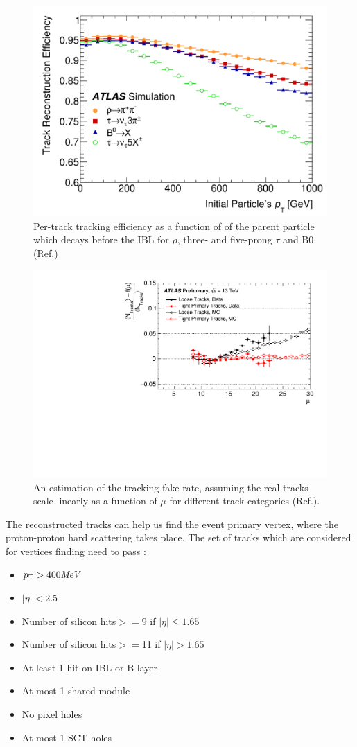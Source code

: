 \begin{figure}[htpb!]
\begin{center}
  \includegraphics[width=0.55\linewidth]{figures/Reco/TrackingEfficiency}
  \caption{Per-track tracking efficiency as a function of \pt of the parent particle which decays before the IBL for $\rho$, three- and five-prong $\tau$ and B0 (Ref.\cite{Aaboud:2017all})}
\label{fig:reco-trackingeff}
\end{center}
\end{figure}

\begin{figure}[htpb!]
\begin{center}
  \includegraphics[width=0.55\linewidth]{figures/Reco/TrackingFake}
\caption{An estimation of the tracking fake rate, assuming the real tracks scale linearly as a function of $\mu$ for different track categories (Ref.\cite{ATL-PHYS-PUB-2015-051}). }
\label{fig:reco-trackingfake}
\end{center}
\end{figure}


The reconstructed tracks can help us find the event primary vertex, where the proton-proton hard scattering takes place. The set of tracks which are considered for vertices finding need to pass \cite{ATL-PHYS-PUB-2015-026}:

\begin{itemize}
\item $p_{{\rm T}} > 400 \textit{MeV}$
\item $|\eta|<2.5$
\item Number of silicon hits$>=$9 if $|\eta|\leq 1.65$
\item Number of silicon hits$>=$11 if $|\eta|>1.65$
\item At least 1 hit on IBL or B-layer
\item At most 1 shared module
\item No pixel holes
\item At most 1 SCT holes
\end{itemize}

